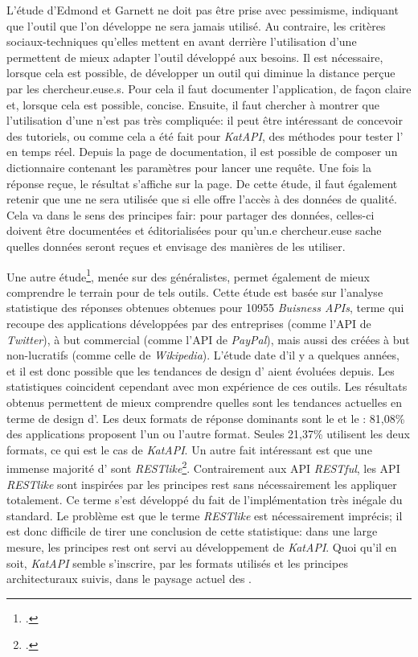 L'étude d'Edmond et Garnett ne doit pas être prise avec pessimisme, indiquant que l'outil que l'on développe ne sera jamais utilisé. Au contraire, les critères sociaux-techniques qu'elles mettent en avant derrière l'utilisation d'une \api{} permettent de mieux adapter l'outil développé aux besoins. Il est nécessaire, lorsque cela est possible, de développer un outil qui diminue la distance perçue par les chercheur.euse.s. Pour cela il faut documenter l'application, de façon claire et, lorsque cela est possible, concise. Ensuite, il faut chercher à montrer que l'utilisation d'une \api{} n'est pas très compliquée: il peut être intéressant de concevoir des tutoriels, ou comme cela a été fait pour \textit{KatAPI}, des méthodes pour tester l'\api{} en temps réel. Depuis la page de documentation, il est possible de composer un \gls{dictionnaire} contenant les paramètres pour lancer une requête. Une fois la réponse reçue, le résultat s'affiche sur la page. De cette étude, il faut également retenir que une \api{} ne sera utilisée que si elle offre l'accès à des données de qualité. Cela va dans le sens des principes \gls{fair}: pour partager des données, celles-ci doivent être documentées et éditorialisées pour qu'un.e chercheur.euse sache quelles données seront reçues et envisage des manières de les utiliser.

Une autre étude\footcite{corral_towards_2014}, menée sur des \api{} généralistes, permet également de mieux comprendre le terrain pour de tels outils. Cette étude est basée sur l'analyse statistique des réponses obtenues obtenues pour 10955 \textit{Buisness APIs}, terme qui recoupe des applications développées par des entreprises (comme l'API de \textit{Twitter}), à but commercial (comme l'API de \textit{PayPal}), mais aussi des \api{} créées à but non-lucratifs (comme celle de \textit{Wikipedia}). L'étude date d'il y a quelques années, et il est donc possible que les tendances de design d'\api{} aient évoluées depuis. Les statistiques coincident cependant avec mon expérience de ces outils. Les résultats obtenus permettent de mieux comprendre quelles sont les tendances actuelles en terme de design d'\api{}. Les deux formats de réponse dominants sont le \json{} et le \xml{}: 81,08\% des applications proposent l'un ou l'autre format. Seules 21,37\% utilisent les deux formats, ce qui est le cas de \textit{KatAPI}. Un autre fait intéressant est que une immense majorité d'\api{} sont \textit{RESTlike}\footcite[p. 3]{corral_towards_2014}. Contrairement aux API \textit{RESTful}, les API \textit{RESTlike} sont inspirées par les principes \gls{rest} sans nécessairement les appliquer totalement. Ce terme s'est développé du fait de l'implémentation très inégale du standard. Le problème est que le terme \textit{RESTlike} est nécessairement imprécis; il est donc difficile de tirer une conclusion de cette statistique: dans une large mesure, les principes \gls{rest} ont servi au développement de \textit{KatAPI}. Quoi qu'il en soit, \textit{KatAPI} semble s'inscrire, par les formats utilisés et les principes architecturaux suivis, dans le paysage actuel des \api{}.

